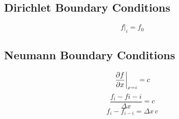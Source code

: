 \subsection{Dirichlet Boundary Conditions}
\begin{equation}
    f\rvert_i = f_0
\end{equation}

\subsection{Neumann Boundary Conditions}
\begin{equation}
    \left. \pdv{f}{x} \right|_{x = i} = c
\end{equation}
\begin{equation}
    \frac{f_i - f{i - i}}{\Delta x} = c
\end{equation}
\begin{equation}
    f_i - f_{i - i}= \Delta x \, c
\end{equation}

